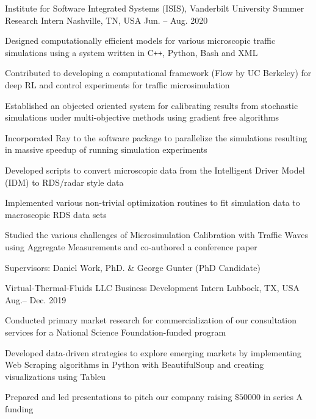 
\begin{cventries}

    \cventry
    {Institute for Software Integrated Systems (ISIS), Vanderbilt University}
    {Summer Research Intern}
    {Nashville, TN, USA}
    {Jun. -- Aug. 2020}
    {
        \begin{cvitems}
        \item{Designed computationally efficient models for various microscopic traffic simulations using a system written in C\texttt{++}, Python, Bash and XML}
        \item{Contributed to developing a computational framework (Flow by UC Berkeley) for deep RL and control experiments for traffic microsimulation}
        \item{Established an objected oriented system for calibrating results from stochastic simulations under multi-objective methods using gradient free algorithms}
        \item{Incorporated Ray to the software package to parallelize the simulations resulting in massive speedup of running simulation experiments}
        \item{Developed scripts to convert microscopic data from the Intelligent Driver Model (IDM) to RDS/radar style data}
        \item{Implemented various non-trivial optimization routines to fit simulation data to macroscopic RDS data sets}
        \item{Studied the various challenges of Microsimulation Calibration with Traffic Waves using Aggregate Measurements and co-authored a conference paper}
        \item{Supervisors: Daniel Work, PhD. \& George Gunter (PhD Candidate)}
        \end{cvitems}
    }

    \cventry
    {Virtual-Thermal-Fluids LLC}
    {Business Development Intern}
    {Lubbock, TX, USA}
    {Aug.-- Dec. 2019}
    {
        \begin{cvitems}
        \item{Conducted primary market research for commercialization of our consultation services for a National Science Foundation-funded program}
        \item{Developed data-driven strategies to explore emerging markets by implementing Web Scraping algorithms in Python with BeautifulSoup and creating visualizations using Tableu}
        \item{Prepared and led presentations to pitch our company raising $\$50000$ in series A funding}
        \end{cvitems}
    }

\end{cventries}
